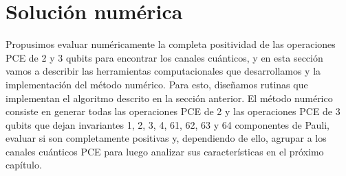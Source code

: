 \section{Solución numérica}\label{sec:ch2_solucionNumerica} %

Propusimos evaluar numéricamente la completa positividad de las 
operaciones PCE de 2 y 3 qubits para encontrar los  
canales cuánticos, y en esta sección vamos a describir las herramientas
computacionales que desarrollamos y la implementación 
del método numérico. Para esto, diseñamos rutinas que 
implementan el algoritmo descrito en la sección anterior.
El método numérico consiste en generar todas 
las operaciones PCE de 2 y las operaciones PCE de 3 qubits que dejan invariantes 
1, 2, 3, 4, 61, 62, 63 y 64 componentes de Pauli,
evaluar si son completamente positivas y, dependiendo de ello, agrupar a 
los canales cuánticos PCE para luego analizar sus características 
en el próximo capítulo.


